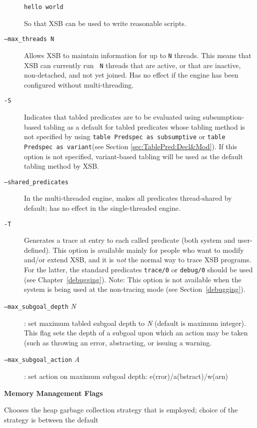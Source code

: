 \begin{description}
\begin{description}
\begin{verbatim}
hello world
\end{verbatim}
So that XSB can be used to write reasonable scripts.
%
\item[{\tt --max\_threads N}] Allows XSB to maintain information for
  up to {\tt N} threads.  This means that XSB can currently run {\tt
    N} threads that are active, or that are inactive, non-detached,
  and not yet joined.  Has no effect if the engine has been configured
  without multi-threading.
\item[{\tt -S}] Indicates that tabled predicates are to be evaluated
  using subsumption-based tabling as a default for tabled predicates
  whose tabling method is not specified by using {\tt table Predspec
    as subsumptive} or {\tt table Predspec as variant}(see Section
  \ref{sec:TablePred:Decl&Mod}).  If this option is not specified,
  variant-based tabling will be used as the default tabling method by
  XSB\@.  
\item[{\tt --shared\_predicates}] In the multi-threaded engine, makes
    all predicates thread-shared by default; has no effect in the
    single-threaded engine.
%
\item[{\tt -T}] Generates a trace at entry to each called predicate
    (both system and user-defined).  This option is available mainly
    for people who want to modify and/or extend XSB, and it is
    {\em not\/} the normal way to trace XSB programs.  For the
    latter, the standard predicates {\tt trace/0} or {\tt debug/0}
    should be used (see Chapter~\ref{debugging}).
    Note: This option is not available when the system is being used
    at the non-tracing mode (see Section~\ref{debugging}).
%
\item[{\tt --max\_subgoal\_depth} {\em N}] : set maximum tabled subgoal
  depth to {\em N} (default is maximum integer).  This flag sets the
  depth of a subgoal upon which an action may be taken (such as
  throwing an error, abstracting, or issuing a warning.
%
\item[{\tt --max\_subgoal\_action} {\em A}] : set action on maximum
  subgoal depth: e(rror)/a(bstract)/w(arn)
\end{description}
%
\item {\bf Memory Management Flags}
\begin{description}
\item[{\tt -g gc\_type}] Chooses the heap garbage collection strategy
  that is employed; choice of the strategy is between the default {\tt
}
\end{description}
\end{description}
